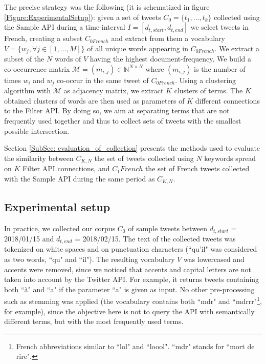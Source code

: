 The precise strategy was the following (it is schematized in figure \ref{Figure:ExperimentalSetup}): given a set of tweets $C_{0}=\{t_{1},\ldots, t_{k}\}$  collected using the Sample API during a time-interval $I = [d_{t,start}, d_{t,end}]$ we select tweets in French, creating a subset $C_{0 French}$ and extract from them a vocabulary $V = \{w_j, \forall j\in[1, \ldots,M]\}$ of all unique words appearing in $C_{0 French}$. We extract a subset of the $N$ words of $V$ having the highest document-frequency. We build a co-occurrence matrix $\mathcal{M} = (m_{i,j}) \in \mathbb{N}^{N\times N}$ where $(m_{i,j})$ is the number of times $w_i$ and $w_j$ co-occur in the same tweet of $C_{0 French}$. Using a clustering algorithm with $\mathcal{M}$ as adjacency matrix, we extract  $K$ clusters of terms. The $K$ obtained clusters of words are then used as parameters of $K$ different connections to the Filter API. By doing so, we aim at separating terms that are not frequently used together and thus to collect sets of tweets with the smallest possible intersection.


Section \ref{SubSec: evaluation_of_collection} presents the methods used to evaluate the similarity between $C_{K,N}$ the set of tweets collected using $N$ keywords spread on $K$ Filter API connections, and $C_1 French$ the set of French tweets collected with the Sample API during the same period as $C_{K,N}$.

			\subsection{Experimental setup}

In practice, we collected our corpus $C_0$ of sample tweets between $d_{t,start} $ = 2018/01/15 and $d_{t,end}$ = 2018/02/15. The text of the collected tweets was tokenized on white spaces and on punctuation characters (``qu'il" was considered as two words, ``qu" and ``il"). The resulting vocabulary $V$ was lowercased and accents were removed, since we noticed that accents and capital letters are not taken into account by the Twitter API. For example, it returns tweets containing both ``à" and ``a" if the parameter ``a" is given as input. No other pre-processing such as stemming was applied (the vocabulary contains both ``mdr" and ``mdrrr"\footnote{French abbreviations similar to ``lol" and ``loool". ``mdr" stands for ``mort de rire".}, for example), since the objective here is not to query the API with semantically different terms, but with the most frequently used terms.


